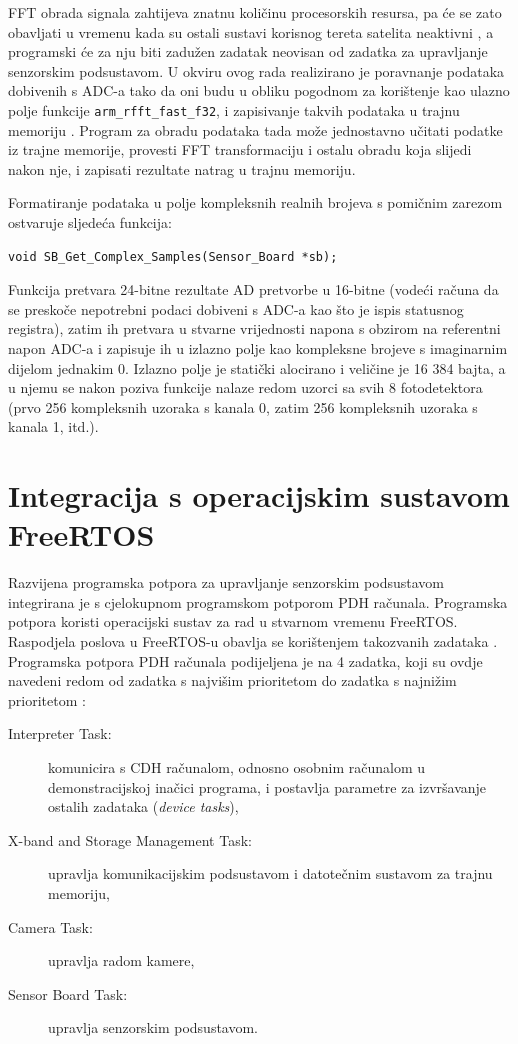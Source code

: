 FFT obrada signala zahtijeva znatnu količinu procesorskih resursa, pa će se zato obavljati u vremenu kada su ostali sustavi korisnog tereta satelita neaktivni , a programski će za nju biti zadužen zadatak neovisan od zadatka za upravljanje senzorskim podsustavom. U okviru ovog rada realizirano je poravnanje podataka dobivenih s ADC-a tako da oni budu u obliku pogodnom za korištenje kao ulazno polje funkcije \texttt{arm\_rfft\_fast\_f32}, i zapisivanje takvih podataka u trajnu memoriju . Program za obradu podataka tada može jednostavno učitati podatke iz trajne memorije, provesti FFT transformaciju i ostalu obradu koja slijedi nakon nje, i zapisati rezultate natrag u trajnu memoriju.

Formatiranje podataka u polje kompleksnih realnih brojeva s pomičnim zarezom ostvaruje sljedeća funkcija:

\begin{lstlisting}
void SB_Get_Complex_Samples(Sensor_Board *sb);
\end{lstlisting}

Funkcija pretvara 24-bitne rezultate AD pretvorbe u 16-bitne (vodeći računa da se preskoče nepotrebni podaci dobiveni s ADC-a kao što je ispis statusnog registra), zatim ih pretvara u stvarne vrijednosti napona s obzirom na referentni napon ADC-a i zapisuje ih u izlazno polje kao kompleksne brojeve s imaginarnim dijelom jednakim 0. Izlazno polje je statički alocirano i veličine je 16 384 bajta, a u njemu se nakon poziva funkcije nalaze redom uzorci sa svih 8 fotodetektora (prvo 256 kompleksnih uzoraka s kanala 0, zatim 256 kompleksnih uzoraka s kanala 1, itd.).

\section{Integracija s operacijskim sustavom FreeRTOS}

Razvijena programska potpora za upravljanje senzorskim podsustavom integrirana je s cjelokupnom programskom potporom PDH računala. Programska potpora koristi operacijski sustav za rad u stvarnom vremenu FreeRTOS. Raspodjela poslova u FreeRTOS-u obavlja se korištenjem takozvanih zadataka . Programska potpora PDH računala podijeljena je na 4 zadatka, koji su ovdje navedeni redom od zadatka s najvišim prioritetom do zadatka s najnižim prioritetom \cite{diplomski_goran_petrak}:

\begin{description}
    \item[Interpreter Task:] komunicira s CDH računalom, odnosno osobnim računalom u demonstracijskoj inačici programa, i postavlja parametre za izvršavanje ostalih zadataka (\textit{device tasks}),
    \item[X-band and Storage Management Task:] upravlja komunikacijskim podsustavom i datotečnim sustavom za trajnu memoriju,
    \item[Camera Task:] upravlja radom kamere,
    \item[Sensor Board Task:] upravlja senzorskim podsustavom.
\end{description}

